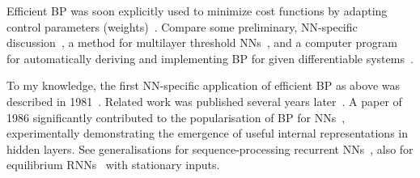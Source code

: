 \documentclass[letterpaper]{article}
\begin{document}
\begin{CJK*}{UTF8}{gbsn}
Efficient BP was soon explicitly used to minimize cost functions by
adapting control parameters (weights)~\citep{dreyfus:1973}.
Compare some preliminary, NN-specific discussion~\citep[section 5.5.1]{Werbos:74}, 
a method for multilayer threshold NNs~\citep{bobrowski78},
and a computer program for automatically deriving and implementing BP 
for given differentiable systems~\citep{SPEELPENNING80A}.


To my knowledge, the first NN-specific application of
efficient BP as above was described in 1981~\citep{Werbos:81sensitivity,werbos2006backwards}.
Related work was published several  years later~\citep{Parker:85,LeCun:85,lecun-88}.
A paper of 1986 significantly contributed to the popularisation of BP for NNs~\citep{Rumelhart:86}, experimentally demonstrating the emergence of useful 
internal representations in hidden layers. 
See generalisations for sequence-processing 
recurrent NNs~\citep[e.g.,][]{Williams:89,RobinsonFallside:87tr,Werbos:88gasmarket,WilliamsZipser:88,WilliamsZipser:89nc,WilliamsZipser:89cs,Rohwer:89,Pearlmutter:89,Gherrity:89,WilliamsPeng:90,Schmidhuber:92ncn3,Pearlmutter:95,baldi95,kremer2001,atiya2000}, also for equilibrium RNNs~\citep{Almeida:87,Pineda:87} with stationary inputs.



%
%
%
%
%
\end{CJK*}
\end{document}

